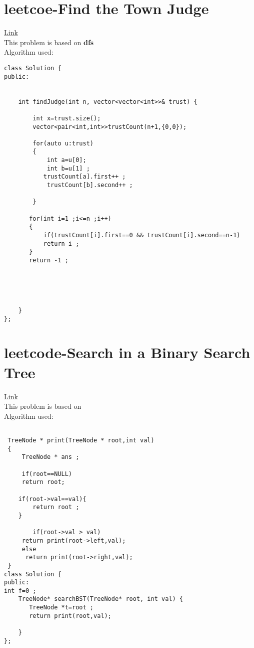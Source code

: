 \documentclass{article}
\begin{document}
\section{leetcoe-Find the Town Judge} \href{https://leetcode.com/problems/find-the-town-judge/description/}{Link} \\

This problem is based on  \textbf{ dfs  }\\
Algorithm used: \textbf{}\\

\begin{lstlisting}[style=cppStyle]
class Solution {
public:


    int findJudge(int n, vector<vector<int>>& trust) {

        int x=trust.size();
        vector<pair<int,int>>trustCount(n+1,{0,0});
        
        for(auto u:trust)
        {
            int a=u[0];
            int b=u[1] ;
           trustCount[a].first++ ;
            trustCount[b].second++ ;

        }

       for(int i=1 ;i<=n ;i++)
       {
           if(trustCount[i].first==0 && trustCount[i].second==n-1)
           return i ;
       }
       return -1 ;
         
         
         

      
    }
};
\end{lstlisting}



\section{leetcode-Search in a Binary Search Tree} \href{https://leetcode.com/problems/search-in-a-binary-search-tree/description/}{Link} \\

This problem is based on  \textbf{   }\\
Algorithm used: \textbf{}\\

\begin{lstlisting}[style=cppStyle]

 TreeNode * print(TreeNode * root,int val)
 {
     TreeNode * ans ;

     if(root==NULL)
     return root;

    if(root->val==val){
        return root ;
    }
 
        if(root->val > val)
     return print(root->left,val);
     else
      return print(root->right,val);
 }
class Solution {
public:
int f=0 ;
    TreeNode* searchBST(TreeNode* root, int val) {
       TreeNode *t=root ;
       return print(root,val);
      
    }
};

\end{lstlisting}
\end{document}
